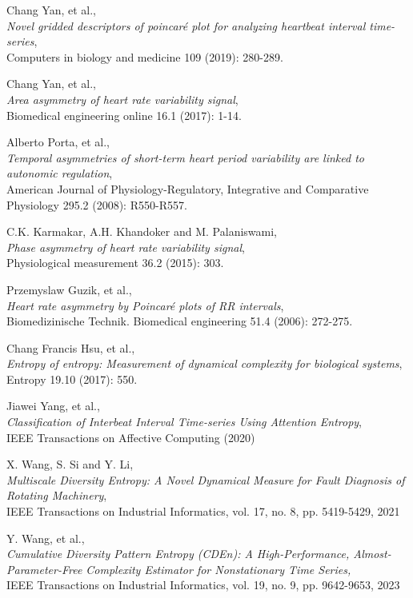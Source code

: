 \documentclass[12pt, a4paper, titlepage, openany]{book}
\begin{document}
\begin{thebibliography}{9}
Chang Yan, et al.,\\
\emph{Novel gridded descriptors of poincaré plot for analyzing heartbeat interval time-series},\\
Computers in biology and medicine 109 (2019): 280-289.

Chang Yan, et al., \\
\emph{Area asymmetry of heart rate variability signal},\\
Biomedical engineering online 16.1 (2017): 1-14.

Alberto Porta, et al.,\\
\emph{Temporal asymmetries of short-term heart period variability are linked to autonomic regulation},\\
American Journal of Physiology-Regulatory, Integrative and Comparative Physiology 295.2 (2008): R550-R557.

C.K. Karmakar, A.H. Khandoker and M. Palaniswami,\\
\emph{Phase asymmetry of heart rate variability signal},\\
Physiological measurement 36.2 (2015): 303.

Przemyslaw Guzik, et al.,\\
\emph{Heart rate asymmetry by Poincaré plots of RR intervals},\\
Biomedizinische Technik. Biomedical engineering 51.4 (2006): 272-275.

Chang Francis Hsu, et al.,\\
\emph{Entropy of entropy: Measurement of dynamical complexity for biological systems},\\
Entropy 19.10 (2017): 550.

Jiawei Yang, et al.,\\
\emph{Classification of Interbeat Interval Time-series Using Attention Entropy},\\
IEEE Transactions on Affective Computing (2020)

X. Wang, S. Si and Y. Li, \\
\emph{Multiscale Diversity Entropy: A Novel Dynamical Measure for Fault  Diagnosis of Rotating Machinery}, \\
IEEE Transactions on Industrial Informatics, vol. 17, no. 8, pp. 5419-5429, 2021

Y. Wang, et al., \\
\emph{Cumulative Diversity Pattern Entropy (CDEn): A High-Performance, Almost-Parameter-Free Complexity Estimator for Nonstationary Time Series,}\\
IEEE Transactions on Industrial Informatics, vol. 19, no. 9, pp. 9642-9653, 2023


\end{thebibliography}
\end{document}
